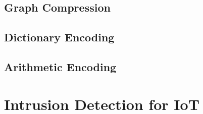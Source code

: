 \subsection{Graph Compression}

\subsection{Dictionary Encoding}

\subsection{Arithmetic Encoding}


\section{Intrusion Detection for IoT}



